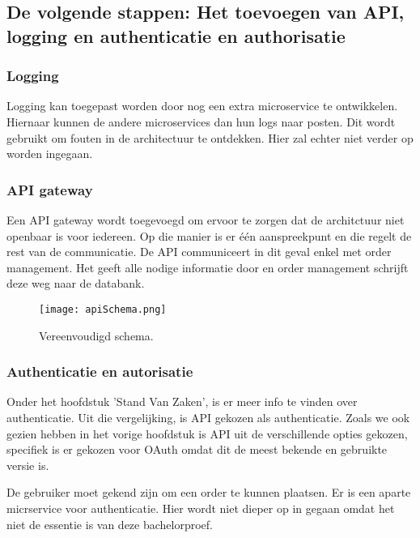 \subsection{De volgende stappen: Het toevoegen van API, logging en authenticatie en authorisatie}
\subsubsection{Logging}
Logging kan toegepast worden door nog een extra microservice te ontwikkelen. Hiernaar kunnen de andere microservices dan hun logs naar posten. Dit wordt gebruikt om fouten in de architectuur te ontdekken. Hier zal echter niet verder op worden ingegaan. 

\subsubsection{API gateway}
Een API gateway wordt toegevoegd om ervoor te zorgen dat de architctuur niet openbaar is voor iedereen. Op die manier is er één aanspreekpunt en die regelt de rest van de communicatie.
De API communiceert in dit geval enkel met order management. Het geeft alle nodige informatie door en order management schrijft deze weg naar de databank.
\begin{figure}[h!]
	\texttt{[image: apiSchema.png]}
	\caption{Vereenvoudigd schema.}
	\centering
\end{figure}

\subsubsection{Authenticatie en autorisatie}
Onder het hoofdstuk 'Stand Van Zaken', is er meer info te vinden over authenticatie. Uit die vergelijking, is API gekozen als authenticatie. Zoals we ook gezien hebben in het vorige hoofdstuk is API uit de verschillende opties gekozen, specifiek is er gekozen voor OAuth omdat dit de meest bekende en gebruikte versie is.

De gebruiker moet gekend zijn om een order te kunnen plaatsen. Er is een aparte micrservice voor authenticatie. Hier wordt niet dieper op in gegaan omdat het niet de essentie is van deze bachelorproef.



